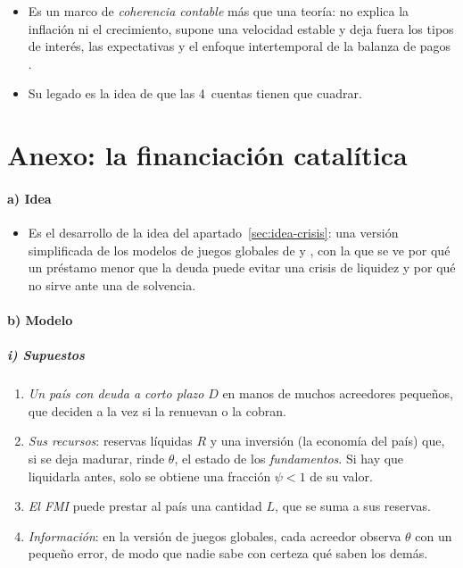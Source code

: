 \documentclass[11pt]{article}
\begin{document}
\begin{itemize}
\item Es un marco de \emph{coherencia contable} más que una teoría: no explica la inflación ni el crecimiento, supone una velocidad estable y deja fuera los tipos de interés, las expectativas y el enfoque intertemporal de la balanza de pagos .
\item Su legado es la idea de que las 4~cuentas tienen que cuadrar.
\end{itemize}

\section{Anexo: la financiación catalítica}\label{anexo:catalitica}

\paragraph{a) Idea}

\begin{itemize}
\item Es el desarrollo de la idea del apartado~\ref{sec:idea-crisis}: una versión simplificada de los modelos de juegos globales de \textcite{CorsettiGuimaraesRoubini2006} y \textcite{MorrisShin2006}, con la que se ve por qué un préstamo menor que la deuda puede evitar una crisis de liquidez y por qué no sirve ante una de solvencia.
\end{itemize}

\paragraph{b) Modelo}

\subparagraph{i) Supuestos}

\begin{enumerate}
\item \emph{Un país con deuda a corto plazo} $D$ en manos de muchos acreedores pequeños, que deciden a la vez si la renuevan o la cobran.
\item \emph{Sus recursos}: reservas líquidas $R$ y una inversión (la economía del país) que, si se deja madurar, rinde $\theta$, el estado de los \emph{fundamentos}. Si hay que liquidarla antes, solo se obtiene una fracción $\psi<1$ de su valor.
\item \emph{El FMI} puede prestar al país una cantidad $L$, que se suma a sus reservas.
\item \emph{Información}: en la versión de juegos globales, cada acreedor observa $\theta$ con un pequeño error, de modo que nadie sabe con certeza qué saben los demás.
\end{enumerate}
\end{document}
